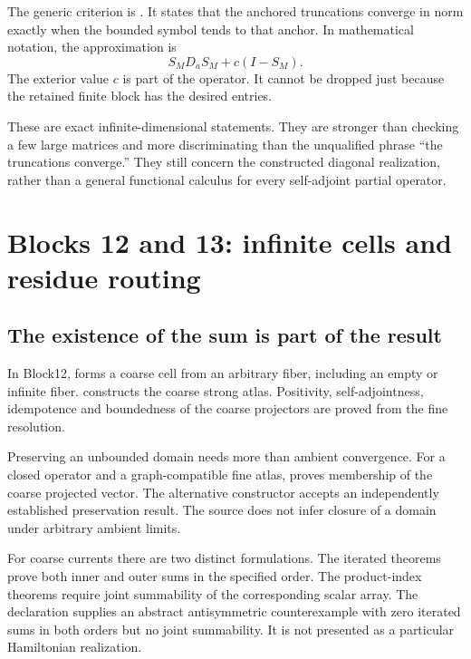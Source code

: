 The generic criterion is . It states that the anchored truncations converge in norm exactly when the bounded symbol tends to that anchor. In mathematical notation, the approximation is
\[
 S_M D_a S_M+c(I-S_M).
\]
The exterior value \(c\) is part of the operator. It cannot be dropped just because the retained finite block has the desired entries.

These are exact infinite-dimensional statements. They are stronger than checking a few large matrices and more discriminating than the unqualified phrase ``the truncations converge.'' They still concern the constructed diagonal realization, rather than a general functional calculus for every self-adjoint partial operator.

\section{Blocks 12 and 13: infinite cells and residue routing}

\subsection{The existence of the sum is part of the result}

In Block12,  forms a coarse cell from an arbitrary fiber, including an empty or infinite fiber.  constructs the coarse strong atlas. Positivity, self-adjointness, idempotence and boundedness of the coarse projectors are proved from the fine resolution.

Preserving an unbounded domain needs more than ambient convergence. For a closed operator and a graph-compatible fine atlas,  proves membership of the coarse projected vector. The alternative constructor  accepts an independently established preservation result. The source does not infer closure of a domain under arbitrary ambient limits.

For coarse currents there are two distinct formulations. The iterated theorems prove both inner and outer sums in the specified order. The product-index theorems require joint summability of the corresponding scalar array. The declaration  supplies an abstract antisymmetric counterexample with zero iterated sums in both orders but no joint summability. It is not presented as a particular Hamiltonian realization.

